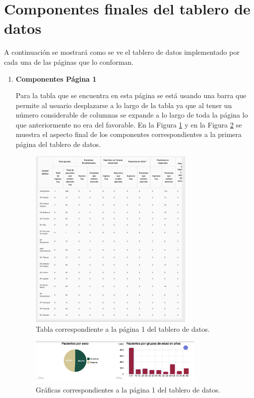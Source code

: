 \section{Componentes finales del tablero de datos}

A continuación se mostrará como se ve el tablero de datos implementado por cada una de las páginas que lo conforman. 
\newpage

\begin{enumerate}
    \item \textbf{Componentes Página 1}

    Para la tabla que se encuentra en esta página se está usando una barra que permite al usuario desplazarse a lo largo de la tabla ya que al tener un número considerable de columnas se expande a lo largo de toda la página lo que anteriormente no era del  favorable. En la Figura \ref{fig:pag1_final_1} y en la Figura \ref{fig:pag1_final_2} se muestra el aspecto final de los componentes correspondientes a la primera página del tablero de datos.
    
    \begin{figure}[h!]
        \centering
        \includegraphics[width=0.75\textwidth]{images/pag1_tabla.png}
        \caption{Tabla correspondiente a la página 1 del tablero de datos.}
        \label{fig:pag1_final_1}
    \end{figure}

    \begin{figure}[h!]
        \centering
        \includegraphics[width=0.8\textwidth]{images/pag1_graficas.png}
        \caption{Gráficas correspondientes a la página 1 del tablero de datos.}
        \label{fig:pag1_final_2}
    \end{figure}


\end{enumerate}
